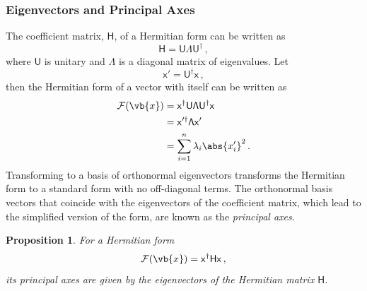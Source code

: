 \documentclass{article}
\theoremstyle{plain}\theoremheaderfont{\normalfont\itshape}\theorembodyfont{\rmfamily}\theoremseparator{.}\newtheorem*{rem}{Remark}\newtheorem*{ex}{Example}\newtheorem*{proof}{Proof}\newtheorem*{altp}{Alternative proof}
\theoremstyle{plain}\theoremheaderfont{\normalfont\bfseries}\theorembodyfont{\rmfamily}\theoremseparator{.}\newtheorem{thm}{Theorem}[section]\newtheorem{lem}[thm]{Lemma}\newtheorem{prop}[thm]{Proposition}\newtheorem*{cor}{Corollary}\newtheorem{defn}[thm]{Definition}\newtheorem{clm}[thm]{Claim}\newtheorem{clminproof}{Claim}
\theoremstyle{break}\theoremheaderfont{\normalfont\itshape}\theorembodyfont{\rmfamily}\theoremseparator{.\medskip}\newtheorem*{proofskip}{Proof}\newtheorem*{exs}{Examples}\newtheorem*{rems}{Remarks}
\theoremstyle{break}\theoremheaderfont{\normalfont\bfseries}\theorembodyfont{\rmfamily}\theoremseparator{.\medskip}\newtheorem{lemskip}[thm]{Lemma}\newtheorem{defnskip}[thm]{Definition}\newtheorem{propskip}[thm]{Proposition}\newtheorem{thmskip}[thm]{Theorem}
\numberwithin{equation}{section}
\begin{document}
	\subsubsection{Eigenvectors and Principal Axes}
	The coefficient matrix, \(\mathsf{H}\), of a Hermitian form can be written as
	\[\mathsf{H=U\Lambda U}^\dagger\,,\]
	where \(\mathsf{U}\) is unitary and \(\mathsf{\Lambda}\) is a diagonal matrix of eigenvalues. Let
	\[\mathsf{x'=U^\dagger x}\,,\]
	then the Hermitian form of a vector with itself can be written as
	\begin{align*}
		\mathcal{F}(\vb{x})&=\mathsf{x^\dagger U\Lambda U^\dagger x}\\
		&=\mathsf{x'^\dagger\Lambda x'}\\
		&=\sum_{i=1}^{n}\lambda_i\abs{x'_i}^2\,.
	\end{align*}
	Transforming to a basis of orthonormal eigenvectors transforms the Hermitian form to a standard form with no off-diagonal terms. The orthonormal basis vectors that coincide with the eigenvectors of the coefficient matrix, which lead to the simplified version of the form, are known as the \textit{principal axes}.
	\begin{prop}
		For a Hermitian form
		\[\mathcal{F}(\vb{x})=\mathsf{x}^\dagger\mathsf{Hx}\,,\]
		its principal axes are given by the eigenvectors of the Hermitian matrix \(\mathsf{H}\).
	\end{prop}
	
\end{document}
